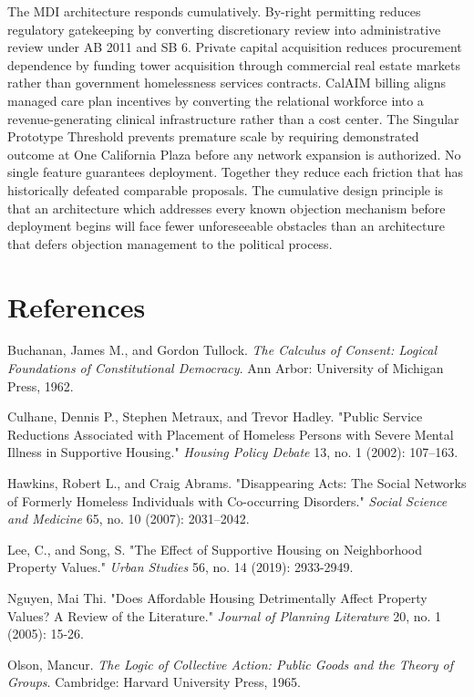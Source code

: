 \documentclass[12pt, letterpaper]{article}
\begin{document}
The MDI architecture responds cumulatively. By-right permitting reduces regulatory gatekeeping by converting discretionary review into administrative review under AB 2011 and SB 6. Private capital acquisition reduces procurement dependence by funding tower acquisition through commercial real estate markets rather than government homelessness services contracts. CalAIM billing aligns managed care plan incentives by converting the relational workforce into a revenue-generating clinical infrastructure rather than a cost center. The Singular Prototype Threshold prevents premature scale by requiring demonstrated outcome at One California Plaza before any network expansion is authorized. No single feature guarantees deployment. Together they reduce each friction that has historically defeated comparable proposals. The cumulative design principle is that an architecture which addresses every known objection mechanism before deployment begins will face fewer unforeseeable obstacles than an architecture that defers objection management to the political process.

\clearpage
{}
\section*{References}

Buchanan, James M., and Gordon Tullock. \textit{The Calculus of Consent: Logical Foundations of Constitutional Democracy}. Ann Arbor: University of Michigan Press, 1962.

Culhane, Dennis P., Stephen Metraux, and Trevor Hadley. "Public Service Reductions Associated with Placement of Homeless Persons with Severe Mental Illness in Supportive Housing." \textit{Housing Policy Debate} 13, no. 1 (2002): 107–163.

Hawkins, Robert L., and Craig Abrams. "Disappearing Acts: The Social Networks of Formerly Homeless Individuals with Co-occurring Disorders." \textit{Social Science and Medicine} 65, no. 10 (2007): 2031–2042.

Lee, C., and Song, S. "The Effect of Supportive Housing on Neighborhood Property Values." \textit{Urban Studies} 56, no. 14 (2019): 2933-2949.

Nguyen, Mai Thi. "Does Affordable Housing Detrimentally Affect Property Values? A Review of the Literature." \textit{Journal of Planning Literature} 20, no. 1 (2005): 15-26.

Olson, Mancur. \textit{The Logic of Collective Action: Public Goods and the Theory of Groups}. Cambridge: Harvard University Press, 1965.
\end{document}
